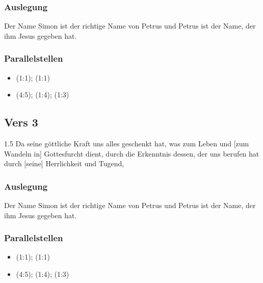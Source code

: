 \documentclass[12pt]{mybibreport}
\begin{document}
\subsubsection{Auslegung}
    \begin{itshape}
        Der Name Simon ist der richtige Name von Petrus und Petrus ist der Name, der ihm Jesus gegeben hat.
    \end{itshape}
\subsubsection{Parallelstellen}
    \begin{itemize}
        \item [Knecht] (1:1); (1:1)
        \item [Glaube] (4:5); (1:4); (1:3)
    \end{itemize}

\subsection{Vers \textbf{3}}
\begin{spacing}{1.5}
Da seine göttliche Kraft uns alles geschenkt hat, was zum Leben und [zum Wandeln in] Gottesfurcht dient, durch die Erkenntnis dessen, der uns berufen hat durch [seine] Herrlichkeit und Tugend,
\end{spacing}
\subsubsection{Auslegung}
    \begin{itshape}
        Der Name Simon ist der richtige Name von Petrus und Petrus ist der Name, der ihm Jesus gegeben hat.
    \end{itshape}
\subsubsection{Parallelstellen}
    \begin{itemize}
        \item {} (1:1); (1:1)
        \item {} (4:5); (1:4); (1:3)
    \end{itemize}
\end{document}
